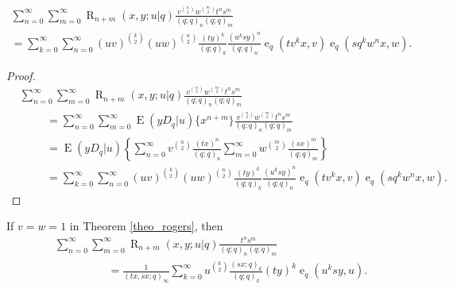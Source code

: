 \documentclass{cimart}
\DeclareMathOperator{\ope}{e}
\DeclareMathOperator{\opE}{E}
\DeclareMathOperator{\opR}{R}
\begin{document}
\begin{theorem}\label{theo_rogers}
    \begin{multline}
        \sum_{n=0}^{\infty}\sum_{m=0}^{\infty}\opR_{n+m}(x,y;u|q)\frac{v^{\binom{n}{2}}w^{\binom{m}{2}}t^{n}s^{m}}{(q;q)_{n}(q;q)_{m}}\\
        =\sum_{k=0}^{\infty}\sum_{n=0}^{\infty}(uv)^{\binom{k}{2}}(uw)^{\binom{n}{2}}\frac{(ty)^k}{(q;q)_{k}}\frac{(u^ksy)^{n}}{(q;q)_{n}}\ope_{q}(tv^kx,v)\ope_{q}(sq^{k}w^{n}x,w).
    \end{multline}
\end{theorem}
\begin{proof}
    \begin{align*}
        &\sum_{n=0}^{\infty}\sum_{m=0}^{\infty}\opR_{n+m}(x,y;u|q)\frac{v^{\binom{n}{2}}w^{\binom{m}{2}}t^{n}s^{m}}{(q;q)_{n}(q;q)_{m}}\\
        &\hspace{1cm}=\sum_{n=0}^{\infty}\sum_{m=0}^{\infty}\opE(yD_{q}|u)\{x^{n+m}\}\frac{v^{\binom{n}{2}}w^{\binom{m}{2}}t^{n}s^{m}}{(q;q)_{n}(q;q)_{m}}\\
        &\hspace{1cm}=\opE(yD_{q}|u)\left\{\sum_{n=0}^{\infty}v^{\binom{n}{2}}\frac{(tx)^{n}}{(q;q)_{n}}\sum_{m=0}^{\infty}w^{\binom{m}{2}}\frac{(sx)^{m}}{(q;q)_{m}}\right\}\\
        &\hspace{1cm}=\sum_{k=0}^{\infty}\sum_{n=0}^{\infty}(uv)^{\binom{k}{2}}(uw)^{\binom{n}{2}}\frac{(ty)^k}{(q;q)_{k}}\frac{(u^ksy)^{n}}{(q;q)_{n}}\ope_{q}(tv^kx,v)\ope_{q}(sq^{k}w^{n}x,w).
    \end{align*}
\end{proof}

\begin{corollary}\label{coro9}
If $v=w=1$ in Theorem \ref{theo_rogers}, then
\begin{align}
    &\sum_{n=0}^{\infty}\sum_{m=0}^{\infty}\opR_{n+m}(x,y;u|q)\frac{t^{n}s^{m}}{(q;q)_{n}(q;q)_{m}}\nonumber\\
    &\hspace{2cm}=\frac{1}{(tx,sx;q)_{\infty}}\sum_{k=0}^{\infty}u^{\binom{k}{2}}\frac{(sx;q)_{k}}{(q;q)_{k}}(ty)^k\ope_{q}(u^{k}sy,u).
\end{align}
\end{corollary}
\end{document}
